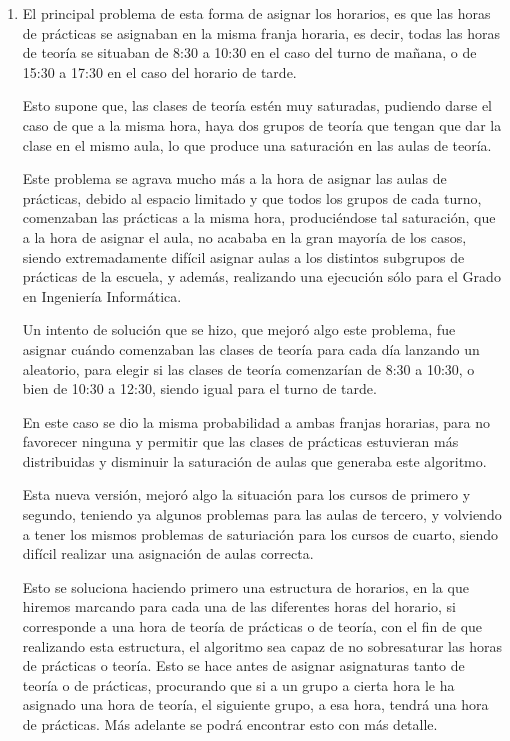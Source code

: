 \begin{enumerate}[---]
    \item El principal problema de esta forma de asignar los horarios, es que las horas de prácticas se asignaban en la misma franja horaria, es decir, todas las horas de teoría se situaban de 8:30 a 10:30 en el caso del turno de mañana, o de 15:30 a 17:30 en el caso del horario de tarde.

    Esto supone que, las clases de teoría estén muy saturadas, pudiendo darse el caso de que a la misma hora, haya dos grupos de teoría que tengan que dar la clase en el mismo aula, lo que produce una saturación en las aulas de teoría.

    Este problema se agrava mucho más a la hora de asignar las aulas de prácticas, debido al espacio limitado y que todos los grupos de cada turno, comenzaban las prácticas a la misma hora, produciéndose tal saturación, que a la hora de asignar el aula, no acababa en la gran mayoría de los casos, siendo extremadamente difícil asignar aulas a los distintos subgrupos de prácticas de la escuela, y además, realizando una ejecución sólo para el Grado en Ingeniería Informática.

    Un intento de solución que se hizo, que mejoró algo este problema, fue asignar cuándo comenzaban las clases de teoría para cada día lanzando un aleatorio, para elegir si las clases de teoría comenzarían de 8:30 a 10:30, o bien de 10:30 a 12:30, siendo igual para el turno de tarde.

    En este caso se dio la misma probabilidad a ambas franjas horarias, para no favorecer ninguna y permitir que las clases de prácticas estuvieran más distribuidas y disminuir la saturación de aulas que generaba este algoritmo.

    Esta nueva versión, mejoró algo la situación para los cursos de primero y segundo, teniendo ya algunos problemas para las aulas de tercero, y volviendo a tener los mismos problemas de saturiación para los cursos de cuarto, siendo difícil realizar una asignación de aulas correcta.

    Esto se soluciona haciendo primero una estructura de horarios, en la que hiremos marcando para cada una de las diferentes horas del horario, si corresponde a una hora de teoría de prácticas o de teoría, con el fin de que realizando esta estructura, el algoritmo sea capaz de no sobresaturar las horas de prácticas o teoría. Esto se hace antes de asignar asignaturas tanto de teoría o de prácticas, procurando que si a un grupo a cierta hora le ha asignado una hora de teoría, el siguiente grupo, a esa hora, tendrá una hora de prácticas. Más adelante se podrá encontrar esto con más detalle.


\end{enumerate}
